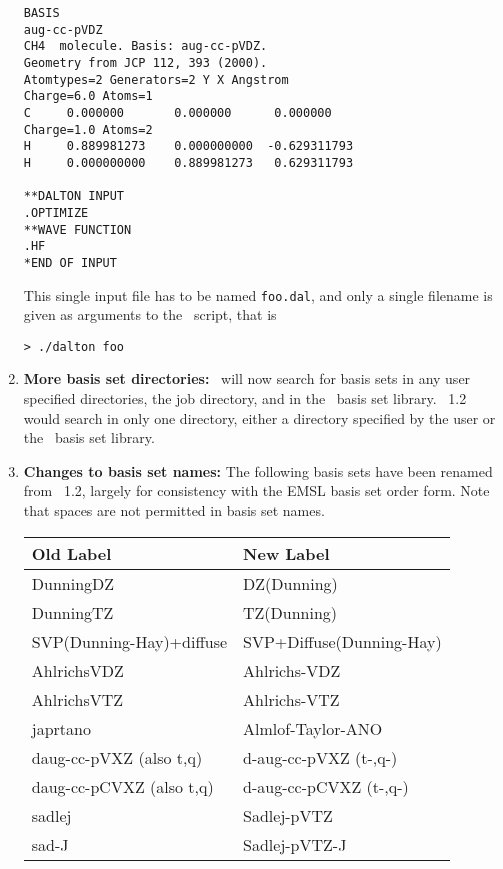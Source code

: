 \begin{enumerate}
\begin{verbatim}
BASIS
aug-cc-pVDZ
CH4  molecule. Basis: aug-cc-pVDZ.
Geometry from JCP 112, 393 (2000).
Atomtypes=2 Generators=2 Y X Angstrom
Charge=6.0 Atoms=1
C     0.000000       0.000000      0.000000
Charge=1.0 Atoms=2
H     0.889981273    0.000000000  -0.629311793
H     0.000000000    0.889981273   0.629311793

**DALTON INPUT
.OPTIMIZE
**WAVE FUNCTION
.HF
*END OF INPUT
\end{verbatim}
This single input file has to be named \verb|foo.dal|, and only a
single filename is given as arguments to the \dalton\ script, that is

\begin{verbatim}
> ./dalton foo
\end{verbatim}

\item{\bf More basis set directories:} \dalton\ will now search for basis sets
in any user specified directories, the job directory, and in the \dalton\ basis
set library. \dalton\ 1.2 would search in only one directory,
either a directory specified by the user
or the \dalton\ basis set library.

\item{\bf Changes to basis set names:} The following basis sets
have been renamed from \dalton\ 1.2, largely for consistency with the 
EMSL basis set order form. Note that spaces are not
permitted in basis set names. 
\begin{center}
\begin{tabular}{|l|l|}\hline
Old Label & New Label \\\hline
DunningDZ & DZ(Dunning)\\
DunningTZ & TZ(Dunning)\\
SVP(Dunning-Hay)+diffuse & SVP+Diffuse(Dunning-Hay) \\
AhlrichsVDZ & Ahlrichs-VDZ \\
AhlrichsVTZ & Ahlrichs-VTZ \\
japrtano & Almlof-Taylor-ANO \\
daug-cc-pVXZ (also t,q) & d-aug-cc-pVXZ (t-,q-)\\
daug-cc-pCVXZ (also t,q) & d-aug-cc-pCVXZ (t-,q-)\\
sadlej & Sadlej-pVTZ \\
sad-J & Sadlej-pVTZ-J \\
\hline
\end{tabular}
\end{center}


\end{enumerate}
